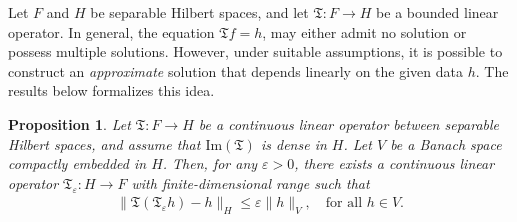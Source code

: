 \documentclass[10pt, reqno]{amsart}
\newtheorem{proposition}{Proposition} [section]
\numberwithin{equation}{section}
\begin{document}
 Let \( F \) and \( H \) be separable Hilbert spaces, and let \( \mathfrak{T}: F \to H \) be a bounded linear operator. In general, the equation \(  \mathfrak{T} f = h \), may either admit no solution or possess multiple solutions. However, under suitable assumptions, it is possible to construct an \textit{approximate} solution that depends linearly on the given data \( h \). The results below formalizes this idea.
\begin{proposition}\cite[Proposition 2.6]{Kuksin_Nersesyan_Shirikyan_2020}\label{prp_approx_right_inverse}
Let \(  \mathfrak{T}: F \to H \) be a continuous linear operator between separable Hilbert spaces, and assume that \( \mathrm{Im}(\mathfrak{T}) \) is dense in \( H \). Let \( V \) be a Banach space compactly embedded in \( H \). Then, for any \( \varepsilon > 0 \), there exists a continuous linear operator \(  \mathfrak{T}_{\varepsilon}: H \to F \) with finite-dimensional range such that
\begin{align}\label{equn_approx_right_inverse}
\|  \mathfrak{T} ( \mathfrak{T}_{\varepsilon} h) - h \|_{H} \leq \varepsilon \|h\|_{V}, \quad \text{for all } h \in V.
\end{align}
\end{proposition}
\end{document}
